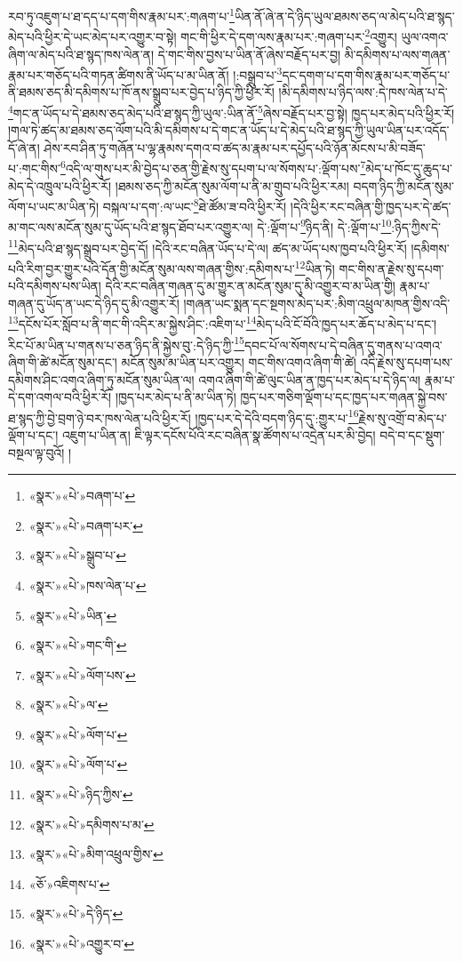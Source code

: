 རབ་ཏུ་འཇུག་པ་ཐ་དད་པ་དག་གིས་རྣམ་པར་:གཞག་པ་\footnote{«སྣར་»«པེ་»བཞག་པ་}ཡིན་ནོ་ཞེ་ན་དེ་ཉིད་ཡུལ་ཐམས་ཅད་ལ་མེད་པའི་ཐ་སྙད་མེད་པའི་ཕྱིར་དེ་ཡང་མེད་པར་འགྱུར་བ་སྟེ། གང་གི་ཕྱིར་དེ་དག་ལས་རྣམ་པར་:གཞག་པར་\footnote{«སྣར་»«པེ་»བཞག་པར་}འགྱུར། ཡུལ་འགའ་ཞིག་ལ་མེད་པའི་ཐ་སྙད་ཁས་ལེན་ན། དེ་གང་གིས་བྱས་པ་ཡིན་ནོ་ཞེས་བརྗོད་པར་བྱ། མི་དམིགས་པ་ལས་གཞན་རྣམ་པར་གཅོད་པའི་གཏན་ཚིགས་ནི་ཡོད་པ་མ་ཡིན་ནོ། །:བསྒྲུབ་པ་\footnote{«སྣར་»«པེ་»སྒྲུབ་པ་}དང་དགག་པ་དག་གིས་རྣམ་པར་གཅོད་པ་ནི་ཐམས་ཅད་མི་དམིགས་པ་ཁོ་ནས་སྒྲུབ་པར་བྱེད་པ་ཉིད་ཀྱི་ཕྱིར་རོ། །མི་དམིགས་པ་ཉིད་ལས་:དེ་ཁས་ལེན་པ་དེ་\footnote{«སྣར་»«པེ་»ཁས་ལེན་པ་}གང་ན་ཡོད་པ་དེ་ཐམས་ཅད་མེད་པའི་ཐ་སྙད་ཀྱི་ཡུལ་:ཡིན་ནོ་\footnote{«སྣར་»«པེ་»ཡིན་}ཞེས་བརྗོད་པར་བྱ་སྟེ། ཁྱད་པར་མེད་པའི་ཕྱིར་རོ། །གལ་ཏེ་ཚད་མ་ཐམས་ཅད་ལོག་པའི་མི་དམིགས་པ་དེ་གང་ན་ཡོད་པ་དེ་མེད་པའི་ཐ་སྙད་ཀྱི་ཡུལ་ཡིན་པར་འདོད་དོ་ཞེ་ན། ཤེས་རབ་ཤིན་ཏུ་གཞོན་པ་ལྷ་རྣམས་དགའ་བ་ཚད་མ་རྣམ་པར་དཔྱོད་པའི་ཉོན་མོངས་པ་མི་བཟོད་པ་:གང་གིས་\footnote{«སྣར་»«པེ་»གང་གི་}འདི་ལ་གུས་པར་མི་བྱེད་པ་ཅན་གྱི་རྗེས་སུ་དཔག་པ་ལ་སོགས་པ་:ལྡོག་པས་\footnote{«སྣར་»«པེ་»ལོག་པས་}མེད་པ་ཁོང་དུ་ཆུད་པ་མེད་དེ་འཁྲུལ་པའི་ཕྱིར་རོ། །ཐམས་ཅད་ཀྱི་མངོན་སུམ་ལོག་པ་ནི་མ་གྲུབ་པའི་ཕྱིར་རམ། བདག་ཉིད་ཀྱི་མངོན་སུམ་ལོག་པ་ཡང་མ་ཡིན་ཏེ། བསྐལ་པ་དག་:ལ་ཡང་\footnote{«སྣར་»«པེ་»ལ་}ཐེ་ཚོམ་ཟ་བའི་ཕྱིར་རོ། །དེའི་ཕྱིར་རང་བཞིན་གྱི་ཁྱད་པར་དེ་ཚད་མ་གང་ལས་མངོན་སུམ་དུ་ཡོད་པའི་ཐ་སྙད་ཐོབ་པར་འགྱུར་ལ། དེ་:ལྡོག་པ་\footnote{«སྣར་»«པེ་»ལོག་པ་}ཉིད་ནི། དེ་:ལྡོག་པ་\footnote{«སྣར་»«པེ་»ལོག་པ་}:ཉིད་ཀྱིས་དེ་\footnote{«སྣར་»«པེ་»ཉིད་ཀྱིས་}མེད་པའི་ཐ་སྙད་སྒྲུབ་པར་བྱེད་དོ། །དེའི་རང་བཞིན་ཡོད་པ་དེ་ལ། ཚད་མ་ཡོད་པས་ཁྱབ་པའི་ཕྱིར་རོ། །དམིགས་པའི་རིག་བྱར་གྱུར་པའི་དོན་གྱི་མངོན་སུམ་ལས་གཞན་གྱིས་:དམིགས་པ་\footnote{«སྣར་»«པེ་»དམིགས་པ་མ་}ཡིན་ཏེ། གང་གིས་ན་རྗེས་སུ་དཔག་པའི་དམིགས་པས་ཡིན། དེའི་རང་བཞིན་གཞན་དུ་མ་གྱུར་ན་མངོན་སུམ་དུ་མི་འགྱུར་བ་མ་ཡིན་གྱི། རྣམ་པ་གཞན་དུ་ཡོད་ན་ཡང་དེ་ཉིད་དུ་མི་འགྱུར་རོ། །གཞན་ཡང་སྨན་དང་སྔགས་མེད་པར་:མིག་འཕྲུལ་མཁན་གྱིས་འདི་\footnote{«སྣར་»«པེ་»མིག་འཕྲུལ་གྱིས་}དངོས་པོར་སློབ་པ་ནི་གང་གི་འདིར་མ་སྐྱེས་ཤིང་:འཇིག་པ་\footnote{«ཅོ་»འཇིགས་པ་}མེད་པའི་ངོ་བོའི་ཁྱད་པར་ཆོད་པ་མེད་པ་དང་། རིང་པོ་མ་ཡིན་པ་གནས་པ་ཅན་ཉིད་ནི་སྐྱེས་བུ་:དེ་ཉིད་ཀྱི་\footnote{«སྣར་»«པེ་»དེ་ཉིད་}དབང་པོ་ལ་སོགས་པ་དེ་བཞིན་དུ་གནས་པ་འགའ་ཞིག་གི་ཚེ་མངོན་སུམ་དང་། མངོན་སུམ་མ་ཡིན་པར་འགྱུར། གང་གིས་འགའ་ཞིག་གི་ཚེ། འདི་རྗེས་སུ་དཔག་པས་དམིགས་ཤིང་འགའ་ཞིག་ཏུ་མངོན་སུམ་ཡིན་ལ། འགའ་ཞིག་གི་ཚེ་ལུང་ཡིན་ན་ཁྱད་པར་མེད་པ་དེ་ཉིད་ལ། རྣམ་པ་དེ་དག་འགལ་བའི་ཕྱིར་རོ། །ཁྱད་པར་མེད་པ་ནི་མ་ཡིན་ཏེ། ཁྱད་པར་གཅིག་ལྡོག་པ་དང་ཁྱད་པར་གཞན་སྐྱེ་བས་ཐ་སྙད་ཀྱི་བྱེ་བྲག་ཉེ་བར་ཁས་ལེན་པའི་ཕྱིར་རོ། །ཁྱད་པར་དེ་དེའི་བདག་ཉིད་དུ་:གྱུར་པ་\footnote{«སྣར་»«པེ་»འགྱུར་བ་}རྗེས་སུ་འགྲོ་བ་མེད་པ་ལྡོག་པ་དང་། འཇུག་པ་ཡིན་ན། ཇི་ལྟར་དངོས་པོའི་རང་བཞིན་སྣ་ཚོགས་པ་འདྲེན་པར་མི་བྱེད། བདེ་བ་དང་སྡུག་བསྔལ་ལྟ་བུའོ། །
